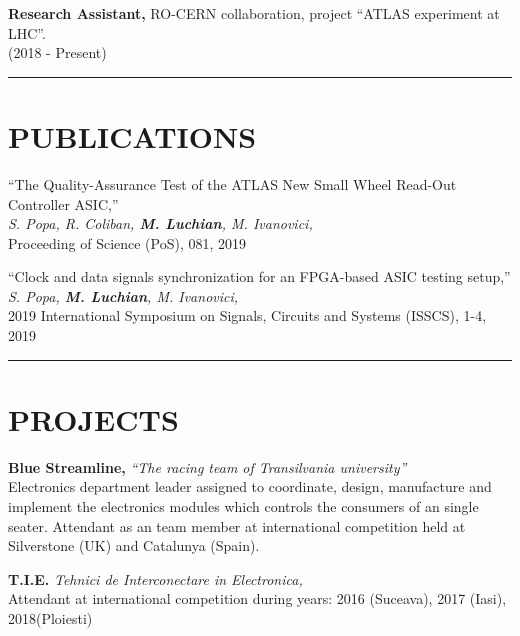 \documentclass{resume}
\begin{document}
\begin{resume}
    {\bf Research Assistant,}
    RO-CERN collaboration, project ``ATLAS experiment at LHC''.\\
    (2018 - Present)

\noindent\rule{\textwidth}{0.4pt}
\section{PUBLICATIONS} 
\vspace{0.1in}

``The Quality-Assurance Test of the ATLAS New Small Wheel Read-Out Controller ASIC,''\\
{\it S. Popa, R. Coliban, {\bf M. Luchian}, M. Ivanovici,}\\
Proceeding of Science (PoS), 081, 2019

 
``Clock and data signals synchronization for an FPGA-based ASIC testing setup,''\\
{\it S. Popa, {\bf M. Luchian}, M. Ivanovici,}\\ 
2019 International Symposium on Signals, Circuits and Systems (ISSCS), 1-4, 2019

\noindent\rule{\textwidth}{0.4pt}
\section{PROJECTS} 
\vspace{0.1in} 

    {\bf Blue Streamline,} {\it ``The racing team of Transilvania university''}\\
    Electronics department leader assigned to coordinate, design, manufacture and implement the electronics modules
    which controls the consumers of an single seater. Attendant as an team member at international competition held at 
    Silverstone (UK) and Catalunya (Spain).

    {\bf T.I.E.} {\it Tehnici de Interconectare in Electronica, }\\
    Attendant at international competition during years:
    2016 (Suceava), 2017 (Iasi), 2018(Ploiesti)

\end{resume}
\end{document}
